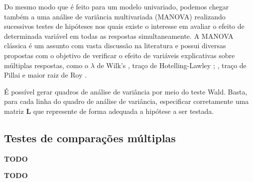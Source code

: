 Do mesmo modo que é feito para um modelo univariado, podemos chegar também a uma análise de variância multivariada (MANOVA) realizando sucessivos testes de hipóteses nos quais existe o interesse em avaliar o efeito de determinada variável em todas as respostas simultaneamente. A MANOVA clássica \citep{manova} é um assunto com vasta discussão na literatura e possui diversas propostas com o objetivo de verificar o efeito de variáveis explicativas sobre múltiplas respostas, como o $\lambda$ de Wilk's \citep{wilks}, traço de Hotelling-Lawley \citep{lawley}; \citep{hotelling}, traço de Pillai \citep{pillai} e maior raiz de Roy \citep{roy}. 

É possível gerar quadros de análise de variância por meio do teste Wald. Basta, para cada linha do quadro de análise de variância, especificar corretamente uma matriz $\boldsymbol{L}$ que represente de forma adequada a hipótese a ser testada.

\subsection{Testes de comparações múltiplas}


\textbf{TODO}


\newpage

\textbf{TODO}

